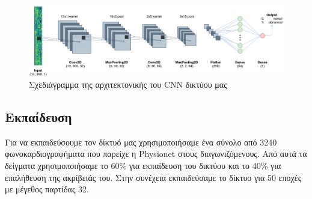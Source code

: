 \documentclass[../main.tex]{subfiles}
\begin{document}
\begin{figure}[H]
	\includegraphics[width=\textwidth]{../images/cnn.png}
	\caption{Σχεδιάγραμμα της αρχιτεκτονικής του CNN δικτύου μας}
	\label{cnn}
\end{figure}


\subsection{Εκπαίδευση}

Για να εκπαιδεύσουμε τον δίκτυό μας χρησιμοποιήσαμε ένα σύνολο από 3240
φωνοκαρδιογραφήματα που παρείχε η Physionet \cite{physionet} στους
διαγωνιζόμενους. Από αυτά τα δείγματα χρησιμοποιήσαμε το 60\% για εκπαίδευση του
δικτύου και το 40\% για επαλήθευση της ακρίβειάς του. Στην συνέχεια εκπαιδεύσαμε
το δίκτυο για 50 εποχές με μέγεθος παρτίδας 32.
\end{document}

